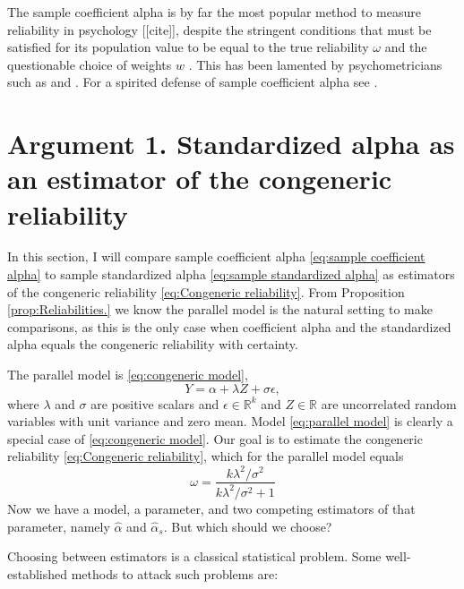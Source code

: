 \documentclass{article}
\theoremstyle{plain}
\theoremstyle{plain}
\theoremstyle{definition}
\theoremstyle{remark}
\theoremstyle{definition}
\theoremstyle{plain}
\theoremstyle{plain}
\theoremstyle{definition}
\DeclareMathOperator{\Cor}{Cor}
\renewcommand{\sqrt}[1]{{(#1)^{1/2}}}
\begin{document}
The sample coefficient alpha is by far the most popular method to
measure reliability in psychology [[cite]], despite the stringent conditions
that must be satisfied for its population value to be equal to the
true reliability $\omega$ and the questionable choice of weights $w$ \citep{McNeish2019-ea}. This has been lamented by psychometricians such as \citet{McNeish2018-vu} and \citet{Sijtsma2009-hj}. For a spirited defense of sample coefficient alpha see \citep{Raykov2019-yr}.

\section{Argument 1. Standardized alpha as an estimator of the congeneric reliability}
\label{sec:arument 1}

In this section, I will compare sample coefficient alpha \eqref{eq:sample coefficient alpha} to sample standardized alpha \eqref{eq:sample standardized alpha} as estimators of the congeneric reliability \eqref{eq:Congeneric reliability}. From Proposition \ref{prop:Reliabilities.} we know the parallel model is the natural setting to make comparisons, as this is the only case when coefficient alpha and the standardized alpha equals the congeneric reliability with certainty.

The parallel model is
\eqref{eq:congeneric model},
\begin{equation}
\label{eq:parallel model}
Y = \alpha + \lambda Z + \sigma\epsilon,
\end{equation}
where $\lambda$ and $\sigma$ are positive scalars and $\epsilon\in\mathbb{R}^k$ and $Z\in\mathbb{R}$ are uncorrelated random variables with unit variance and zero mean. Model \eqref{eq:parallel model} is clearly a special case of \eqref{eq:congeneric model}. Our goal is to estimate the congeneric reliability \eqref{eq:Congeneric reliability}, which for the parallel model equals
\begin{equation}
\label{eq:parallel_omega}
\omega = \frac{k\lambda^2/\sigma^2}{k\lambda^2/\sigma^2 + 1}
\end{equation}
Now we have a model, a parameter, and two competing estimators of that parameter, namely $\hat{\alpha}$ and $\hat{\alpha}_s$. But which should we choose? 

Choosing between estimators is a classical statistical problem. Some well-established methods to attack such problems are:

\end{document}
